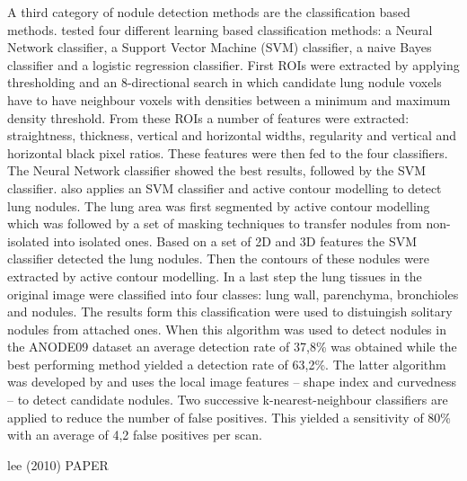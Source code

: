 A third category of nodule detection methods are the classification based
methods. \cite{ozekes} tested four different learning based classification
methods: a Neural Network classifier, a Support Vector Machine (SVM) classifier,
a naive Bayes classifier and a logistic regression classifier. First ROIs were
extracted by applying thresholding and an 8-directional search in which
candidate lung nodule voxels have to have neighbour voxels with densities
between a minimum and maximum density threshold. From these ROIs a number of
features were extracted: straightness, thickness, vertical and horizontal
widths, regularity and vertical and horizontal black pixel ratios. These
features were then fed to the four classifiers. The Neural Network classifier
showed the best results, followed by the SVM classifier. \cite{keshani} also
applies an SVM classifier and active contour modelling to detect lung nodules.
The lung area was first segmented by active contour modelling which was followed
by a set of masking techniques to transfer nodules from non-isolated into
isolated ones. Based on a set of 2D and 3D features the SVM classifier detected
the lung nodules. Then the contours of these nodules were extracted
by active contour modelling. In a last step the lung tissues in the original
image were classified into four classes: lung wall, parenchyma, bronchioles and
nodules. The results form this classification were used to distuingish solitary
nodules from attached ones. When this algorithm was used to detect nodules in
the ANODE09 dataset an average detection rate of 37,8\% was obtained while the
best performing method yielded a detection rate of 63,2\%. The latter algorithm
was developed by \cite{mur} and uses the local image features -- shape index and
curvedness -- to detect candidate nodules. Two successive k-nearest-neighbour
classifiers are applied to reduce the number of false positives. This yielded a
sensitivity of 80\% with an average of 4,2 false positives per scan.

lee (2010) PAPER

